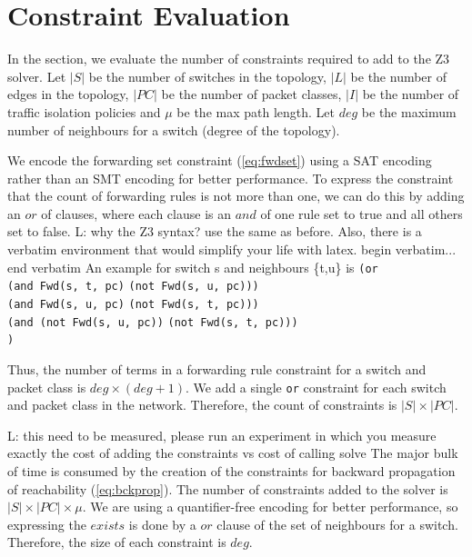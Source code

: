 \documentclass[]{sig}
\newcommand{\loris}[1]{\textcolor[rgb]{0.00,0.00,1.00}{L: #1}}
\begin{document}
\section{Constraint Evaluation}
In the section, we evaluate the number of constraints required to add to the Z3 solver. Let $|S|$ be the number of switches in the topology, $|L|$ be the number of edges in the topology, $|PC|$ be the number of packet classes, $|I|$ be the number of traffic isolation policies and $\mu$ be the max path length. Let $deg$ be the maximum number of neighbours for a switch (degree of the topology).

We encode the forwarding set constraint (\cref{eq:fwdset}) using a SAT encoding rather than an SMT encoding for better performance. To express the constraint that the count of forwarding rules is not more than one, we can do this by adding an $or$ of clauses, where each clause is an $and$ of one rule set to true and all others set to false.
\loris{why the Z3 syntax? use the same as before.
Also, there is a verbatim environment that would simplify your life with latex. begin {verbatim}... end {verbatim} }
An example for switch s and neighbours \{t,u\} is \newline
\verb|(or| \\
\hspace*{10pt}\verb|(and Fwd(s, t, pc)|  \verb|(not Fwd(s, u, pc)))| \\
\hspace*{10pt}\verb|(and Fwd(s, u, pc)|  \verb|(not Fwd(s, t, pc)))| \\
\hspace*{10pt}\verb|(and (not Fwd(s, u, pc))|  \verb|(not Fwd(s, t, pc)))|\\
\verb|)| 

Thus, the number of terms in a forwarding rule constraint for a switch and packet class is $deg \times (deg+1)$. We add a single \verb|or| constraint for each switch and packet class in the network. Therefore, the count of constraints is $|S| \times |PC|$.

\loris{this need to be measured, please run an experiment in which you measure exactly
the cost of adding the constraints vs cost of calling solve}
The major bulk of time is consumed by the creation of the constraints for backward propagation of reachability (\cref{eq:bckprop}). The number of constraints added to the solver is $|S| \times |PC| \times \mu$. We are using a quantifier-free encoding for better performance, so expressing the $exists$ is done by a $or$ clause of the set of neighbours for a switch. Therefore, the size of each constraint is $deg$. 
\end{document}

